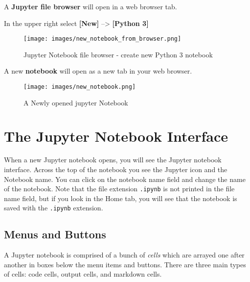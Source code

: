 \documentclass{book}
\makeatletter
\def\maxwidth{\ifdim\Gin@nat@width>\linewidth\linewidth
\else\Gin@nat@width\fi}
\let\Oldincludegraphics\includegraphics
\renewcommand{\includegraphics}[1]{\Oldincludegraphics[width=.8\maxwidth]{#1}}
\newcommand{\passthrough}[1]{#1}
\makeatother
\begin{document}
A \textbf{Jupyter file browser} will open in a web browser tab.

In the upper right select \textbf{{[}New{]}} --\textgreater{}
\textbf{{[}Python 3{]}}

\begin{figure}
\centering
\texttt{[image: images/new\_notebook\_from\_browser.png]}
\caption{Jupyter Notebook file browser - create new Python 3 notebook}
\end{figure}

A new \textbf{notebook} will open as a new tab in your web browser.

\begin{figure}
\centering
\texttt{[image: images/new\_notebook.png]}
\caption{A Newly opened jupyter Notebook}
\end{figure}
    




    
        \hypertarget{the-jupyter-notebook-interface}{%
\section{The Jupyter Notebook
Interface}\label{the-jupyter-notebook-interface}}
    




    
        When a new Jupyter notebook opens, you will see the Jupyter notebook
interface. Across the top of the notebook you see the Jupyter icon and
the Notebook name. You can click on the notebook name field and change
the name of the notebook. Note that the file extension
\passthrough{\lstinline!.ipynb!} is not printed in the file name field,
but if you look in the Home tab, you will see that the notebook is saved
with the \passthrough{\lstinline!.ipynb!} extension.
    




    
        \hypertarget{menus-and-buttons}{%
\subsection{Menus and Buttons}\label{menus-and-buttons}}

A Jupyter notebook is comprised of a bunch of \emph{cells} which are
arrayed one after another in boxes below the menu items and buttons.
There are three main types of cells: code cells, output cells, and
markdown cells.
    
\end{document}
